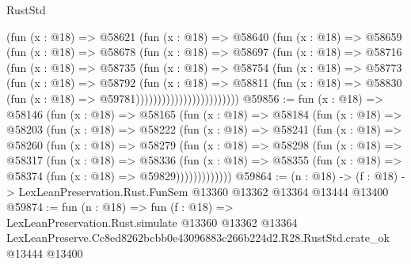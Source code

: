 \begin{lexlean}{RustStd}
\begin{coremodule}
                          (fun (x : @18) =>
                          @58621
                            (fun (x : @18) =>
                            @58640
                              (fun (x : @18) =>
                              @58659
                                (fun (x : @18) =>
                                @58678
                                  (fun (x : @18) =>
                                  @58697
                                    (fun (x : @18) =>
                                    @58716
                                      (fun (x : @18) =>
                                      @58735
                                        (fun (x : @18) =>
                                        @58754
                                          (fun (x : @18) =>
                                          @58773
                                            (fun (x : @18) =>
                                            @58792
                                              (fun (x : @18) =>
                                              @58811
                                                (fun (x : @18) =>
                                                @58830
                                                  (fun (x : @18) => @59781))))))))))))))))))))))))
@59856 := fun (x : @18) =>
  @58146
    (fun (x : @18) =>
    @58165
      (fun (x : @18) =>
      @58184
        (fun (x : @18) =>
        @58203
          (fun (x : @18) =>
          @58222
            (fun (x : @18) =>
            @58241
              (fun (x : @18) =>
              @58260
                (fun (x : @18) =>
                @58279
                  (fun (x : @18) =>
                  @58298
                    (fun (x : @18) =>
                    @58317
                      (fun (x : @18) =>
                      @58336
                        (fun (x : @18) =>
                        @58355 (fun (x : @18) => @58374 (fun (x : @18) => @59829)))))))))))))
@59864 := (n : @18) ->
  (f : @18) -> LexLeanPreservation.Rust.FunSem @13360 @13362 @13364 @13444 @13400
@59874 := fun (n : @18) =>
  fun (f : @18) =>
  LexLeanPreservation.Rust.simulate
    @13360
    @13362
    @13364
    LexLeanPreserve.Cc8ed8262bcbb0e43096883c266b224d2.R28.RustStd.crate_ok
    @13444
    @13400
\end{coremodule}
\end{lexlean}
